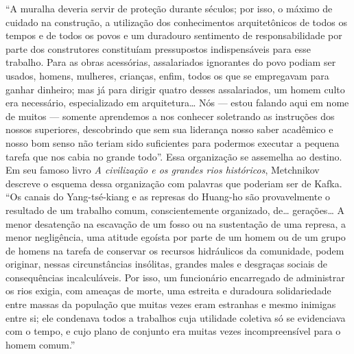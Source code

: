 ``A muralha deveria servir de proteção durante séculos; por isso, o
 máximo de cuidado na construção, a utilização dos conhecimentos
 arquitetônicos de todos os tempos e de todos os povos e um duradouro
 sentimento de responsabilidade por parte dos construtores constituíam
 pressupostos indispensáveis para esse trabalho. Para as obras acessórias,
 assalariados ignorantes do povo podiam ser usados, homens, mulheres,
 crianças, enfim, todos os que se empregavam para ganhar dinheiro; mas já
 para dirigir quatro desses assalariados, um homem culto era necessário,
 especializado em arquitetura\ldots{} Nós --- estou falando aqui em nome de
 muitos --- somente aprendemos a nos conhecer soletrando as instruções
 dos nossos superiores, descobrindo que sem sua liderança nosso saber
 acadêmico e nosso bom senso não teriam sido suficientes para podermos
 executar a pequena tarefa que nos cabia no grande todo''. Essa
organização se assemelha ao destino. Em seu famoso livro \textit{A civilização
e os grandes rios históricos}, Metchnikov descreve o esquema dessa
organização com palavras que poderiam ser de Kafka. ``Os canais do
Yang-tsé-kiang e as represas do Huang-ho são provavelmente o resultado
de um trabalho comum, conscientemente organizado, de\ldots{} gerações\ldots{} A
menor desatenção na escavação de um fosso ou na sustentação de uma
represa, a menor negligência, uma atitude egoísta por parte de um homem
ou de um grupo de homens na tarefa de conservar os recursos hidráulicos
da comunidade, podem originar, nessas circunstâncias insólitas, grandes
males e desgraças sociais de consequências incalculáveis. Por isso, um
funcionário encarregado de administrar os rios exigia, com ameaças de
morte, uma estreita e duradoura solidariedade entre massas da população
que muitas vezes eram estranhas e mesmo inimigas entre si; ele condenava
todos a trabalhos cuja utilidade coletiva só se evidenciava com o tempo,
e cujo plano de conjunto era muitas vezes incompreensível para o homem
comum.''

